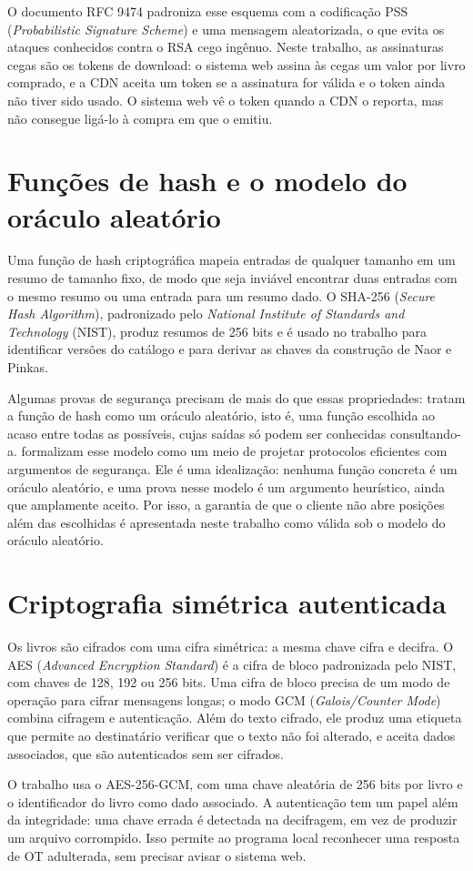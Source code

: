 O documento RFC 9474 \cite{rfc9474} padroniza esse esquema com a codificação
PSS (\emph{Probabilistic Signature Scheme}) e uma mensagem aleatorizada, o que evita os ataques conhecidos contra o
RSA cego ingênuo. Neste trabalho, as assinaturas cegas são os tokens de
download: o sistema web assina às cegas um valor por livro comprado, e a CDN
aceita um token se a assinatura for válida e o token ainda não tiver sido
usado. O sistema web vê o token quando a CDN o reporta, mas não consegue
ligá-lo à compra em que o emitiu.

\section{Funções de hash e o modelo do oráculo aleatório}\label{sec:hash}

Uma função de hash criptográfica mapeia entradas de qualquer tamanho em um
resumo de tamanho fixo, de modo que seja inviável encontrar duas entradas com
o mesmo resumo ou uma entrada para um resumo dado. O SHA-256 (\emph{Secure Hash
Algorithm}), padronizado pelo \emph{National Institute of Standards and
Technology} (NIST), produz resumos de 256 bits \cite{fips1804} e é usado no trabalho para
identificar versões do catálogo e para derivar as chaves da construção de
Naor e Pinkas.

Algumas provas de segurança precisam de mais do que essas propriedades: tratam
a função de hash como um oráculo aleatório, isto é, uma função escolhida ao
acaso entre todas as possíveis, cujas saídas só podem ser conhecidas
consultando-a.  formalizam esse modelo como um meio de
projetar protocolos eficientes com argumentos de segurança. Ele é uma
idealização: nenhuma função concreta é um oráculo aleatório, e uma prova nesse
modelo é um argumento heurístico, ainda que amplamente aceito. Por isso, a
garantia de que o cliente não abre posições além das escolhidas é apresentada
neste trabalho como válida sob o modelo do oráculo aleatório.

\section{Criptografia simétrica autenticada}\label{sec:aes-gcm}

Os livros são cifrados com uma cifra simétrica: a mesma chave cifra e decifra.
O AES (\emph{Advanced Encryption Standard}) \cite{fips197} é a cifra de bloco
padronizada pelo NIST, com chaves de 128, 192 ou 256 bits. Uma cifra de bloco
precisa de um modo de operação para cifrar mensagens longas; o modo GCM
(\emph{Galois/Counter Mode}) \cite{dworkin2007} combina cifragem e
autenticação. Além do texto cifrado, ele produz uma etiqueta que permite ao
destinatário verificar que o texto não foi alterado, e aceita dados
associados, que são autenticados sem ser cifrados.

O trabalho usa o AES-256-GCM, com uma chave aleatória de 256 bits por livro e o
identificador do livro como dado associado. A autenticação tem um papel além
da integridade: uma chave errada é detectada na decifragem, em vez de produzir
um arquivo corrompido. Isso permite ao programa local reconhecer uma resposta
de OT adulterada, sem precisar avisar o sistema web.
